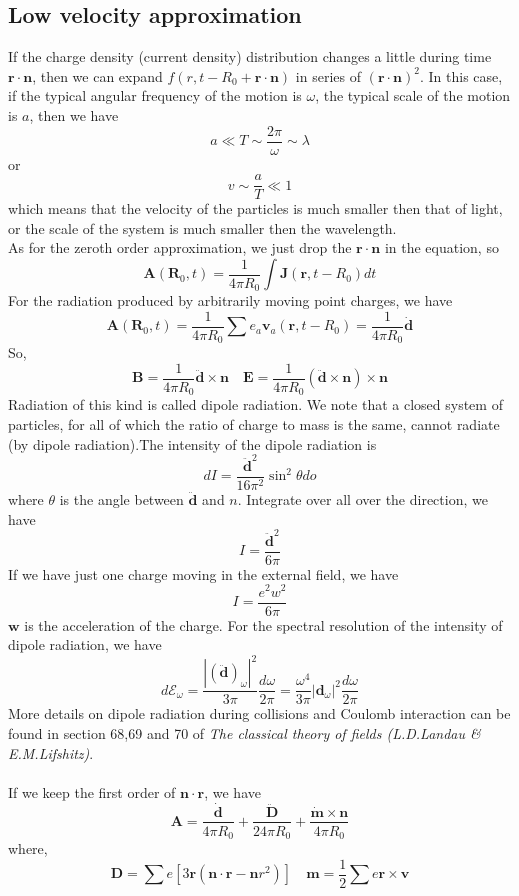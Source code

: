 \subsection{Low velocity approximation}
If the charge density (current density) distribution changes a little during time $\bm{r}\cdot\bm{n}$, then we can expand $f(r,t-R_0+\bm{r}\cdot\bm{n})$ in series of $(\bm{r}\cdot\bm{n})^2$. In this case, if the typical angular frequency of the motion is $\omega$, the typical scale of the motion is $a$, then we have
\[a \ll T \sim \frac{2\pi}{\omega} \sim \lambda\]
or
\[v \sim \frac{a}{T} \ll 1\]
which means that the velocity of the particles is much smaller then that of light, or the scale of the system is much smaller then the wavelength.\\
As for the zeroth order approximation, we just drop the $\bm{r}\cdot\bm{n}$ in the equation, so
\[\bm{A}(\bm{R}_0,t) = \frac{1}{4\pi R_0} \int \bm{J}(\bm{r},t-R_0) dt\]
For the radiation produced by arbitrarily moving point charges, we have
\[\bm{A}(\bm{R}_0,t) = \frac{1}{4\pi R_0} \sum e_a \bm{v}_a(\bm{r},t-R_0) = \frac{1}{4\pi R_0} \dot{\bm{d}}\]
So,
\[\bm{B} = \frac{1}{4\pi R_0} \ddot{\bm{d}} \times \bm{n} \quad \bm{E} = \frac{1}{4\pi R_0} (\ddot{\bm{d}} \times \bm{n})\times \bm{n}\]
Radiation of this kind is called dipole radiation. 
We note that a closed system of particles, for all of which the ratio of charge to mass is the same, cannot radiate (by dipole radiation).The intensity of the dipole radiation is
\[dI = \frac{\ddot{\bm{d}}^2}{16\pi^2} \sin^2\theta do\]
where $\theta$ is the angle between $\ddot{\bm{d}}$ and $n$.
Integrate over all over the direction, we have
\[I = \frac{\ddot{\bm{d}}^2}{6\pi}\]
If we have just one charge moving in the external field, we have
\[I = \frac{e^2 w^2}{6\pi}\]
$\bm{w}$ is the acceleration of the charge.
For the spectral resolution of the intensity of dipole radiation, we have
\[d\mathcal{E}_{\omega} = \frac{|(\ddot{\bm{d}})_{\omega}|^2}{3\pi}\frac{d\omega}{2\pi} = \frac{\omega^4}{3\pi}|\bm{d}_{\omega}|^2 \frac{d\omega}{2\pi}\]
More details on dipole radiation during collisions and Coulomb interaction can be found in section 68,69 and 70 of \emph{The classical theory of fields (L.D.Landau \& E.M.Lifshitz)}.
\\ \\
If we keep the first order of $\bm{n}\cdot\bm{r}$, we have
\[\bm{A} = \frac{\dot{\bm{d}}}{4\pi R_0} + \frac{\ddot{\bm{D}}}{24\pi R_0} + \frac{\dot{\bm{m}}\times \bm{n}}{4\pi R_0}\]
where,
\[\bm{D} = \sum e[3\bm{r}(\bm{n}\cdot\bm{r} - \bm{n}r^2)] \quad \bm{m} = \frac{1}{2} \sum e\bm{r}\times\bm{v}\]

